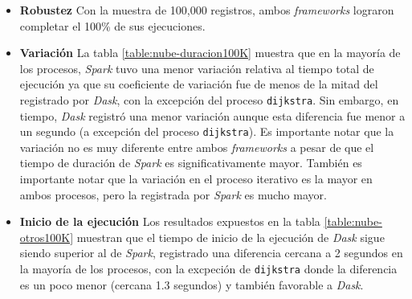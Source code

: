 \begin{itemize}
	
	\item \textbf{Robustez} Con la muestra de 100,000 registros, ambos \textit{frameworks} lograron completar el 100\% de sus ejecuciones.
	
	\item \textbf{Variación} La tabla \ref{table:nube-duracion100K} muestra que en la mayoría de los procesos, \textit{Spark} tuvo una menor variación relativa al tiempo total de ejecución ya que su coeficiente de variación fue de menos de la mitad del registrado por \textit{Dask}, con la excepción del proceso \texttt{dijkstra}. Sin embargo, en tiempo, \textit{Dask} registró una menor variación aunque esta diferencia fue menor a un segundo (a excepción del proceso \texttt{dijkstra}). Es importante notar que la variación no es muy diferente entre ambos \textit{frameworks} a pesar de que el tiempo de duración de \textit{Spark} es significativamente mayor. También es importante notar que la variación en el proceso iterativo es la mayor en ambos procesos, pero la registrada por \textit{Spark} es mucho mayor.
	
	\item \textbf{Inicio de la ejecución} Los resultados expuestos en la tabla \ref{table:nube-otros100K} muestran que el tiempo de inicio de la ejecución de \textit{Dask} sigue siendo superior al de \textit{Spark}, registrado una diferencia cercana a 2 segundos en la mayoría de los procesos, con la excpeción de \texttt{dijkstra} donde la diferencia es un poco menor (cercana 1.3 segundos) y también favorable a \textit{Dask}. 
	

\end{itemize}
